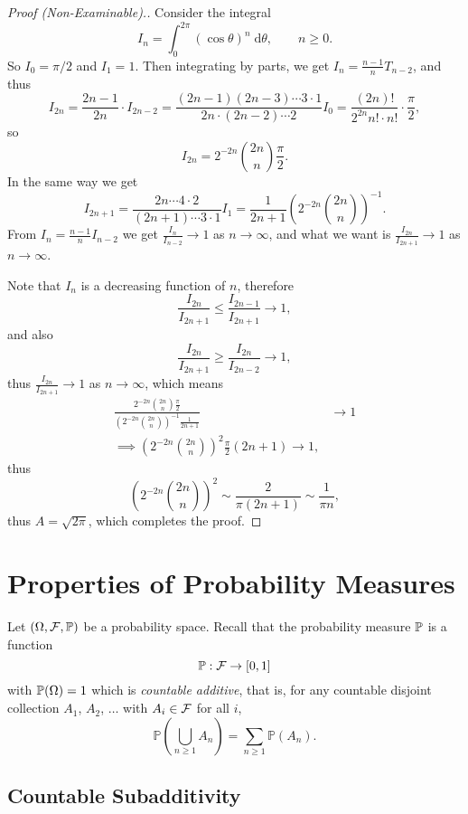 \documentclass[a4paper]{scrreprt}
\begin{document}
\begin{proof}[Proof (Non-Examinable).]
	Consider the integral
	$$
	I_n = \int_0^{2 \pi} (\cos \theta)^n \; \mathrm{d}\theta, \quad \quad n \geq 0.
	$$
	So $I_0 = \pi/2$ and $I_1 = 1$. Then integrating by parts, we get $I_n = \frac{n - 1}{n} T_{n - 2}$, and thus
	$$
	I_{2n} = \frac{2n - 1}{2n} \cdot I_{2n - 2} = \frac{(2n - 1)(2n - 3)\cdots 3 \cdot 1}{2n \cdot (2n - 2) \cdots 2} I_0 = \frac{(2n)!}{2^{2n} n! \cdot n!} \cdot \frac{\pi}{2},
	$$
	so
	$$
	I_{2n} = 2^{-2n} \binom{2n}{n} \frac{\pi}{2}.
	$$
	In the same way we get
	$$
	I_{2n + 1} = \frac{2n \cdots 4 \cdot 2}{(2n + 1) \cdots 3 \cdot 1} I_1 = \frac{1}{2n + 1} \left(2^{-2n} \binom{2n}{n}\right)^{-1}.
	$$
	From $I_n = \frac{n - 1}{n}I_{n - 2}$ we get $\frac{I_n}{I_{n - 2}}\rightarrow 1$ as $n \rightarrow \infty$, and what we want is
	$\frac{I_{2n}}{I_{2n + 1}} \rightarrow 1$ as $n \rightarrow \infty$.

	Note that $I_n$ is a decreasing function of $n$, therefore
	$$
	\frac{I_{2n}}{I_{2n + 1}} \leq \frac{I_{2n - 1}}{I_{2n + 1}} \rightarrow 1,
	$$
	and also
	$$
	\frac{I_{2n}}{I_{2n + 1}} \geq \frac{I_{2n}}{I_{2n - 2}} \rightarrow 1,
	$$
	thus $\frac{I_{2n}}{I_{2n+ 1}} \rightarrow 1$ as $n \rightarrow \infty$, which means
	\begin{align*}
		\frac{2^{-2n} \binom{2n}{n} \frac{\pi}{2}}{\left(2^{-2n} \binom{2n}{n}\right)^{-1} \frac{1}{2n + 1}} &\rightarrow 1 \\
\implies \left(2^{-2n} \binom{2n}{n}\right)^{2} \frac{\pi}{2} (2n + 1) \rightarrow 1,
	\end{align*}
	thus
	$$
	\left(2^{-2n} \binom{2n}{n}\right)^{2} \sim \frac{2}{\pi (2n + 1)} \sim \frac{1}{\pi n},
	$$
	thus $A = \sqrt{2 \pi}$, which completes the proof.
\end{proof}

\chapter{Properties of Probability Measures}

Let $(\Omega, \mathcal{F}, \mathbb{P})$ be a probability space. Recall that the probability measure $\mathbb{P}$ is a function
$$
\mathbb{P} : \mathcal{F} \rightarrow [0, 1]
$$
with $\mathbb{P}(\Omega) = 1$ which is \emph{countable additive}, that is, for any countable disjoint collection $A_1$, $A_2$, $\dots$ with $A_i \in \mathcal{F}$ for all $i$,
$$
\mathbb{P}\left(\bigcup_{n \geq 1} A_{n}\right)=\sum_{n \geq 1} \mathbb{P}\left(A_{n}\right).
$$

\section{Countable Subadditivity}
\end{document}
